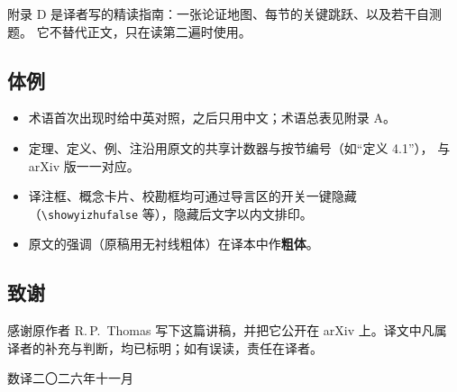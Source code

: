 附录 D 是译者写的精读指南：一张论证地图、每节的关键跳跃、以及若干自测题。
它不替代正文，只在读第二遍时使用。

\subsection*{体例}

\begin{itemize}[leftmargin=1.6em,itemsep=0.2em]
\item 术语首次出现时给中英对照，之后只用中文；术语总表见附录 A。
\item 定理、定义、例、注沿用原文的共享计数器与按节编号（如“定义 4.1”），
      与 arXiv 版一一对应。
\item 译注框、概念卡片、校勘框均可通过导言区的开关一键隐藏
      （\verb|\showyizhufalse| 等），隐藏后文字以内文排印。
\item 原文的强调（原稿用无衬线粗体）在译本中作\textbf{粗体}。
\end{itemize}

\subsection*{致谢}

感谢原作者 R.\,P.~Thomas 写下这篇讲稿，并把它公开在 arXiv 上。译文中凡属
译者的补充与判断，均已标明；如有误读，责任在译者。

\vspace{0.5em}
\begin{flushright}
数译\quad 二〇二六年十一月
\end{flushright}

\newpage
